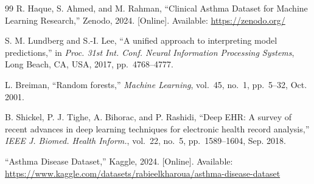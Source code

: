 \documentclass[11pt,a4paper]{article}
\begin{document}
\begin{thebibliography}{99}
R. Haque, S. Ahmed, and M. Rahman, ``Clinical Asthma Dataset for Machine Learning
Research,'' Zenodo, 2024. [Online]. Available: \url{https://zenodo.org/}

S. M. Lundberg and S.-I. Lee, ``A unified approach to interpreting model
predictions,'' in \textit{Proc. 31st Int. Conf. Neural Information Processing
Systems}, Long Beach, CA, USA, 2017, pp.~4768--4777.

L. Breiman, ``Random forests,'' \textit{Machine Learning},
vol.~45, no.~1, pp.~5--32, Oct. 2001.

B. Shickel, P. J. Tighe, A. Bihorac, and P. Rashidi, ``Deep EHR: A survey of
recent advances in deep learning techniques for electronic health record analysis,''
\textit{IEEE J. Biomed. Health Inform.}, vol.~22, no.~5, pp.~1589--1604,
Sep. 2018.

``Asthma Disease Dataset,'' Kaggle, 2024. [Online]. Available:
\url{https://www.kaggle.com/datasets/rabieelkharoua/asthma-disease-dataset}

\end{thebibliography}
\end{document}
